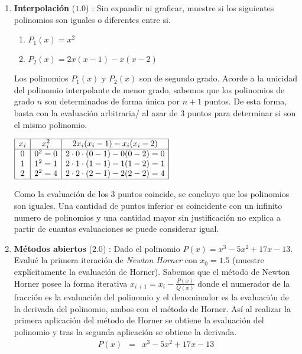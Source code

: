 \documentclass[12pt]{article}
\begin{document}
  \begin{enumerate}[leftmargin=*,widest=9]
    \item \textbf{Interpolación} ($1.0$) : Sin expandir ni graficar, muestre si los siguientes polinomios son iguales o diferentes entre si.
    \begin{enumerate}[label=\alph*]
    \item \(P_1(x) = x^2\)
    \item \(P_2(x) = 2x(x-1)-x(x-2)\)
    \end{enumerate}
    Los polinomios $P_1(x)$ y $P_2(x)$ son de segundo grado. Acorde a la unicidad del polinomio interpolante de menor grado, sabemos que los polinomios de grado $n$ son determinados de forma única por $n+1$ puntos. De esta forma, basta con la evaluación arbitraria/ al azar de 3 puntos para determinar si son el mismo polinomio.
    \begin{center}
    \(    \begin{array}{|c|c|c|}
    \hline
    x_i & x_i^2 & 2x_i(x_i-1)-x_i(x_i-2)\\
    \hline
    0 & 0^2 = 0 & 2\cdot 0 \cdot (0-1)-0(0-2) = 0 \\
    1 & 1^2 = 1 & 2\cdot 1 \cdot (1-1)-1(1-2) = 1 \\
    2 & 2^2 = 4 & 2\cdot 2 \cdot (2-1)-2(2-2) = 4 \\
    \hline
    \end{array} \)
    \end{center}
    Como la evaluación de los 3 puntos coincide, se concluyo que los polinomios son iguales. Una cantidad de puntos inferior es coincidente con un infinito numero de polinomios y una cantidad mayor sin justificación no explica a partir de cuantas evaluaciones se puede considerar igual.
    \item \textbf{Métodos abiertos} ($2.0$) : Dado el polinomio \(P(x) = x^3 - 5x^2 + 17x -13\). Evalué la primera iteración de \textit{Newton Horner} con \(x_0 = 1.5\) (muestre explícitamente la evaluación de Horner).
    Sabemos que el método de Newton Horner posee la forma iterativa \(x_{i+1} = x_i - \frac{P(x)}{Q(x)}\) donde el numerador de la fracción es la evaluación del polinomio y el denominador es la evaluación de la derivada del polinomio, ambos con el método de Horner.
Así al realizar la primera aplicación del método de Horner se obtiene la evaluación del polinomio y tras la segunda aplicación se obtiene la derivada.
\begin{eqnarray*}
P(x) & = & x^3 - 5x^2 + 17x -13\\

\end{eqnarray*}
\end{enumerate}
\end{document}
